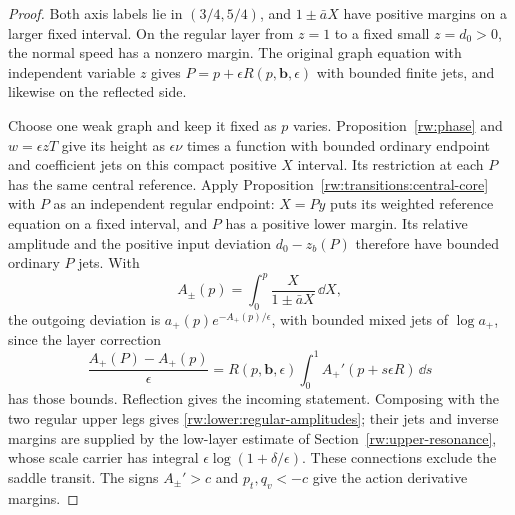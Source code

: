 \begin{proof}
Both axis labels lie in $(3/4,5/4)$, and $1\pm\bar aX$ have
positive margins on a larger fixed interval. On the regular layer
from $z=1$ to a fixed small $z=d_0>0$, the normal speed has a
nonzero margin. The original graph equation with independent variable
$z$ gives $P=p+\epsilon R(p,\mathbf b,\epsilon)$ with bounded
finite jets, and likewise on the reflected side.

Choose one weak graph and keep it fixed as $p$ varies.
Proposition~\ref{rw:phase}
and $w=\epsilon zT$ give its height as $\epsilon\nu$ times a
function with bounded ordinary endpoint and coefficient jets on this
compact positive $X$ interval. Its restriction at each $P$ has the
same central reference. Apply Proposition~\ref{rw:transitions:central-core}
with $P$ as an independent regular endpoint: $X=Py$ puts its weighted
reference equation on a fixed interval, and $P$ has a positive lower
margin. Its relative amplitude and the positive input deviation
$d_0-z_b(P)$ therefore have bounded ordinary $P$ jets.
With
\[
 A_\pm(p)=\int_0^p\frac{X}{1\pm\bar aX}\,\dd X,
\]
the outgoing deviation is $a_+(p)e^{-A_+(p)/\epsilon}$, with
bounded mixed jets of $\log a_+$, since the layer correction
\[
 \frac{A_+(P)-A_+(p)}{\epsilon}
   =R(p,\mathbf b,\epsilon)
       \int_0^1 A_+'(p+s\epsilon R)\,\dd s
\]
has those bounds. Reflection gives the incoming statement. Composing
with the two regular upper legs gives \eqref{rw:lower:regular-amplitudes};
their jets and inverse margins are supplied by the low-layer estimate
of Section~\ref{rw:upper-resonance}, whose scale carrier has integral
$\epsilon\log(1+\delta/\epsilon)$. These connections exclude the
saddle transit. The signs $A_\pm'>c$ and $p_t,q_v<-c$ give the
action derivative margins.


\end{proof}
